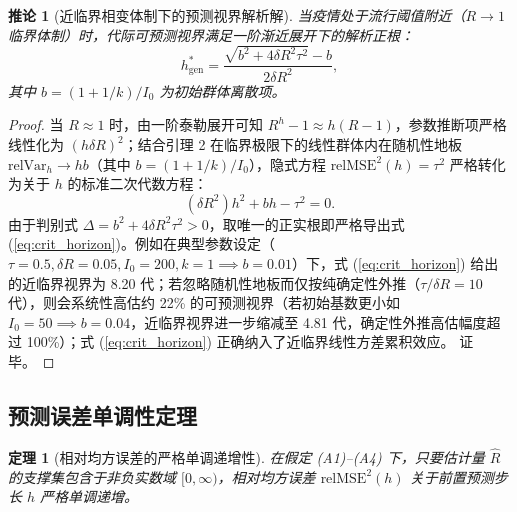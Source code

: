 \documentclass[11pt,a4paper]{article}
\theoremstyle{plain}
\newtheorem{theorem}{定理}
\newtheorem{corollary}{推论}
\theoremstyle{definition}
\begin{document}
\begin{corollary}[近临界相变体制下的预测视界解析解]\label{cor:near_crit_horizon}
当疫情处于流行阈值附近（$R \to 1$ 临界体制）时，代际可预测视界满足一阶渐近展开下的解析正根：
\begin{equation}
h^*_{\text{gen}} = \frac{\sqrt{b^2 + 4 \delta R^2 \tau^2} - b}{2 \delta R^2},
\label{eq:crit_horizon}
\end{equation}
其中 $b = (1+1/k)/I_0$ 为初始群体离散项。
\end{corollary}

\begin{proof}
当 $R \approx 1$ 时，由一阶泰勒展开可知 $R^h - 1 \approx h(R-1)$，参数推断项严格线性化为 $(h\delta R)^2$；结合引理 2 在临界极限下的线性群体内在随机性地板 $\text{relVar}_h \to h b$（其中 $b=(1+1/k)/I_0$），隐式方程 $\text{relMSE}^2(h)=\tau^2$ 严格转化为关于 $h$ 的标准二次代数方程：
\begin{equation}
(\delta R^2) h^2 + b h - \tau^2 = 0.
\end{equation}
由于判别式 $\Delta = b^2 + 4 \delta R^2 \tau^2 > 0$，取唯一的正实根即严格导出式 (\ref{eq:crit_horizon})。例如在典型参数设定（$\tau=0.5, \delta R=0.05, I_0=200, k=1 \implies b=0.01$）下，式 (\ref{eq:crit_horizon}) 给出的近临界视界为 8.20 代；若忽略随机性地板而仅按纯确定性外推（$\tau/\delta R = 10$ 代），则会系统性高估约 22\% 的可预测视界（若初始基数更小如 $I_0=50 \implies b=0.04$，近临界视界进一步缩减至 4.81 代，确定性外推高估幅度超过 100\%）；式 (\ref{eq:crit_horizon}) 正确纳入了近临界线性方差累积效应。
证毕。
\end{proof}

\subsection{预测误差单调性定理}

\begin{theorem}[相对均方误差的严格单调递增性]\label{thm:monotonicity}
在假定 (A1)--(A4) 下，只要估计量 $\hat{R}$ 的支撑集包含于非负实数域 $[0, \infty)$，相对均方误差 $\text{relMSE}^2(h)$ 关于前置预测步长 $h$ 严格单调递增。
\end{theorem}
\end{document}
